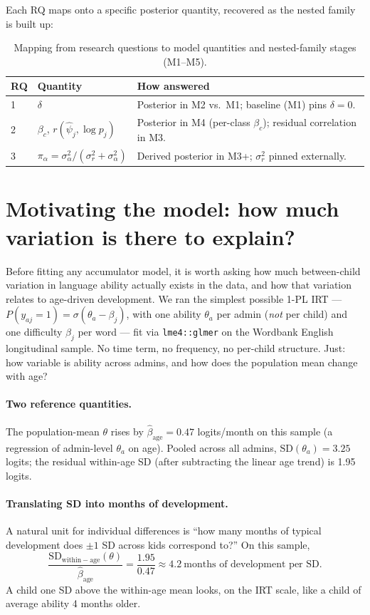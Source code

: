 \documentclass[11pt]{article}
\begin{document}
Each RQ maps onto a specific posterior quantity, recovered as the
nested family is built up:

\begin{table}[h]
\centering
\small
\begin{tabular}{@{}lll@{}}
\toprule
RQ & Quantity & How answered \\
\midrule
1 & \(\delta\) & Posterior in M2 vs.\ M1; baseline (M1) pins \(\delta=0\). \\
2 & \(\beta_c\), \(r(\hat\psi_j, \log p_j)\) &
  Posterior in M4 (per-class \(\beta_c\)); residual correlation in M3. \\
3 & \(\pi_\alpha = \sigma_\alpha^2/(\sigma_r^2 + \sigma_\alpha^2)\) &
  Derived posterior in M3+; \(\sigma_r^2\) pinned externally. \\
\bottomrule
\end{tabular}
\caption{Mapping from research questions to model quantities and
nested-family stages (M1--M5).}
\label{tab:rq-map}
\end{table}

\section{Motivating the model: how much variation is there to explain?}
\label{sec:precursor}

Before fitting any accumulator model, it is worth asking how much
between-child variation in language ability actually exists in the
data, and how that variation relates to age-driven development. We
ran the simplest possible 1-PL IRT —
\(P(y_{aj} = 1) = \sigma(\theta_a - \beta_j)\), with one ability
\(\theta_a\) per admin (\emph{not} per child) and one difficulty
\(\beta_j\) per word — fit via \texttt{lme4::glmer} on the Wordbank
English longitudinal sample. No time term, no frequency, no per-child
structure. Just: how variable is ability across admins, and how does
the population mean change with age?

\paragraph{Two reference quantities.} The population-mean
\(\theta\) rises by \(\hat \beta_{\mathrm{age}} = 0.47\) logits/month
on this sample (a regression of admin-level \(\theta_a\) on age).
Pooled across all admins, \(\mathrm{SD}(\theta_a) = 3.25\) logits;
the residual within-age SD (after subtracting the linear age trend)
is 1.95 logits.

\paragraph{Translating SD into months of development.} A natural
unit for individual differences is ``how many months of typical
development does \(\pm 1\) SD across kids correspond to?'' On this
sample,
\[
\frac{\mathrm{SD}_{\mathrm{within-age}}(\theta)}
     {\hat \beta_{\mathrm{age}}}
= \frac{1.95}{0.47}
\approx 4.2~\text{months of development per SD}.
\]
A child one SD above the within-age mean looks, on the IRT scale,
like a child of average ability 4 months older.
\end{document}
